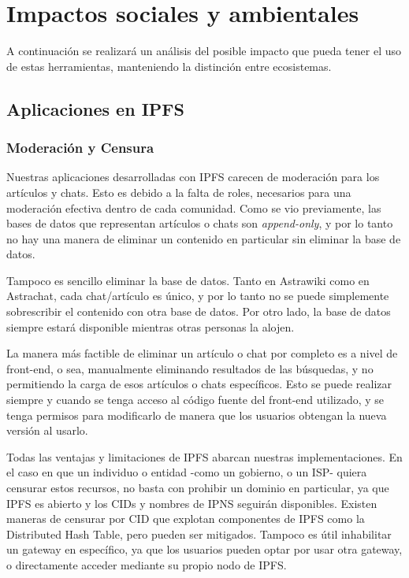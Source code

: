 \section{Impactos sociales y ambientales}

A continuación se realizará un análisis del posible impacto que pueda tener el uso de estas herramientas, manteniendo la distinción entre ecosistemas.

\subsection{Aplicaciones en IPFS}

\subsubsection{Moderación y Censura}

Nuestras aplicaciones desarrolladas con IPFS carecen de moderación para los artículos y chats. Esto es debido a la falta de roles, necesarios para una moderación efectiva dentro de cada comunidad. Como se vio previamente, las bases de datos que representan artículos o chats son \textit{append-only}, y por lo tanto no hay una manera de eliminar un contenido en particular sin eliminar la base de datos.

Tampoco es sencillo eliminar la base de datos. Tanto en Astrawiki como en Astrachat, cada chat/artículo es único, y por lo tanto no se puede simplemente sobrescribir el contenido con otra base de datos. Por otro lado, la base de datos siempre estará disponible mientras otras personas la alojen.

La manera más factible de eliminar un artículo o chat por completo es a nivel de front-end, o sea, manualmente eliminando resultados de las búsquedas, y no permitiendo la carga de esos artículos o chats específicos. Esto se puede realizar siempre y cuando se tenga acceso al código fuente del front-end utilizado, y se tenga permisos para modificarlo de manera que los usuarios obtengan la nueva versión al usarlo.

Todas las ventajas y limitaciones de IPFS abarcan nuestras implementaciones. En el caso en que un individuo o entidad -como un gobierno, o un ISP- quiera censurar estos recursos, no basta con prohibir un dominio en particular, ya que IPFS es abierto y los CIDs y nombres de IPNS seguirán disponibles. Existen maneras de censurar por CID que explotan componentes de IPFS como la Distributed Hash Table, pero pueden ser mitigados. \cite{censorship-ipfs} Tampoco es útil inhabilitar un gateway en específico, ya que los usuarios pueden optar por usar otra gateway, o directamente acceder mediante su propio nodo de IPFS.

